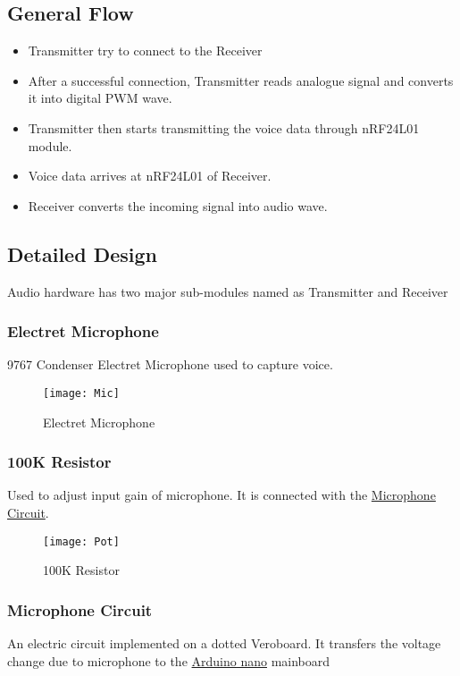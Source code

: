 \subsection{General Flow}

\begin{itemize}

\item Transmitter try to connect to the Receiver
\item After a successful connection, Transmitter reads analogue signal and converts it into digital PWM wave.
\item Transmitter then starts transmitting the voice data through nRF24L01 module.
\item Voice data arrives at nRF24L01 of Receiver.
\item Receiver converts the incoming signal into audio wave.


\end{itemize}

\subsection{Detailed Design}
Audio hardware has two major sub-modules named as Transmitter and Receiver

\subsubsection{Electret Microphone}
9767 Condenser Electret Microphone used to capture voice.
\begin{figure}[h]
  \centering
  \texttt{[image: Mic]}
  \caption{Electret Microphone}
\end{figure}


\subsubsection{100K Resistor}
Used to adjust input gain of microphone. It is connected with the \underline{Microphone Circuit}.

\begin{figure}[h]
  \centering
  \texttt{[image: Pot]}
  \caption{100K Resistor}
\end{figure}

\subsubsection{Microphone Circuit}
An electric circuit implemented on a dotted Veroboard. It transfers the voltage change due to microphone to the \underline{Arduino nano} mainboard


